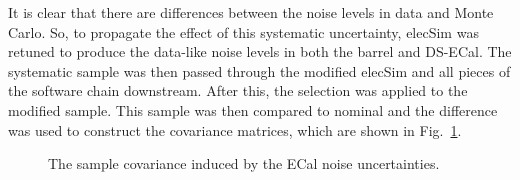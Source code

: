 It is clear that there are differences between the noise levels in data and Monte Carlo.  So, to propagate the effect of this systematic uncertainty, elecSim was retuned to produce the data-like noise levels in both the barrel and DS-ECal.  The systematic sample was then passed through the modified elecSim and all pieces of the software chain downstream.  After this, the selection was applied to the modified sample.  This sample was then compared to nominal and the difference was used to construct the covariance matrices, which are shown in Fig.~\ref{fig:ECalNoiseCovarianceMatrices}.
\begin{figure}%
  \centering
  \caption{The sample covariance induced by the ECal noise uncertainties.}
  \label{fig:ECalNoiseCovarianceMatrices}
\end{figure}
\newline
\newline
